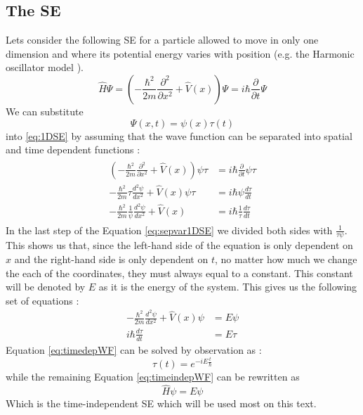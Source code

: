 \documentclass[../master_thesis.tex]{subfiles}
\begin{document}
\subsection{The \ac{SE}}
Lets consider the following \ac{SE} for a particle allowed to move in only one dimension
and where its potential energy varies with position (e.g. the Harmonic oscillator
model \cite{Cohen:1973, Atkins:2014}).
\begin{equation}
  \hat{H}\Psi = \left(-\frac{\hbar^2}{2m}\frac{\partial^2 }{\partial x^2} + \hat{V}(x)\right)\Psi = i\hbar\frac{\partial}{\partial t} \Psi\label{eq:1DSE}
\end{equation}
We can substitute $$\Psi(x, t)=\psi(x)\tau(t)$$ into \ref{eq:1DSE}
by assuming that the wave function can be separated into spatial and time dependent
functions \cite{Atkins:2011}:
\begin{align}
  \begin{split}\label{eq:sepvar1DSE}
    \left(-\frac{\hbar^2}{2m}\frac{\partial^2 }{\partial x^2} + \hat{V}(x)\right)\psi\tau &= i\hbar\frac{\partial}{\partial t} \psi\tau \\
    -\frac{\hbar^2}{2m}\tau\frac{d^2 \psi}{d x^2} + \hat{V}(x)\psi\tau &= i\hbar\psi\frac{d\tau}{d t}\\
    -\frac{\hbar^2}{2m}\frac{1}{\psi}\frac{d^2\psi }{d x^2} + \hat{V}(x) &= i\hbar\frac{1}{\tau}\frac{d\tau}{d t}
  \end{split}
\end{align}
In the last step of the Equation \ref{eq:sepvar1DSE} we divided both sides with $\frac{1}{\tau\psi}$.
This shows us that, since the left-hand side of the equation is only dependent on $x$ and the right-hand
side is only dependent on $t$, no matter how much we change the each of the coordinates, they must always equal to
a constant. This constant will be denoted by $E$ as it is the energy of the system. This gives us the following set of equations \cite{Atkins:2011}:
\begin{subequations}
  \label{eq:sysSE}
  \begin{align}
    -\frac{\hbar^2}{2m}\frac{d^2\psi}{d x^2} + \hat{V}(x)\psi &= E\psi  \label{eq:timeindepWF}\\
    i\hbar\frac{d\tau}{d t} &= E\tau  \label{eq:timedepWF}
  \end{align}
\end{subequations}
Equation \ref{eq:timedepWF} can be solved by observation as \cite{Atkins:2011, Cohen:1973} :
\begin{equation}
  \tau(t) = e^{-iE\frac{t}{\hbar}}
\end{equation}
while the remaining Equation \ref{eq:timeindepWF} can be rewritten as
\begin{equation}
  \hat{H}\psi = E\psi\label{eq:timeindepSE}
\end{equation}
Which is the time-independent \ac{SE} which will be used most on this text.
\end{document}
